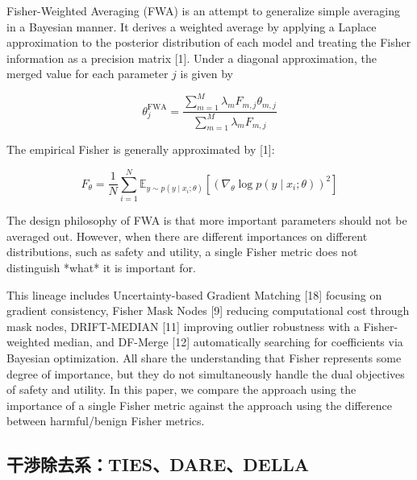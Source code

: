 \documentclass{article}
\begin{document}
Fisher-Weighted Averaging (FWA) is an attempt to generalize simple averaging in a Bayesian manner. It derives a weighted average by applying a Laplace approximation to the posterior distribution of each model and treating the Fisher information as a precision matrix [1]. Under a diagonal approximation, the merged value for each parameter $j$ is given by

\[
\theta_j^{\mathrm{FWA}}=\frac{\sum_{m=1}^{M}\lambda_m F_{m,j}\theta_{m,j}}{\sum_{m=1}^{M}\lambda_m F_{m,j}}
\tag{4}
\]

The empirical Fisher is generally approximated by [1]:

\[
\hat F_{\theta}=\frac{1}{N}\sum_{i=1}^{N}\mathbb{E}_{y\sim p(y\mid x_i;\theta)}\left[(\nabla_{\theta}\log p(y\mid x_i;\theta))^2\right]
\tag{5}
\]

The design philosophy of FWA is that more important parameters should not be averaged out. However, when there are different importances on different distributions, such as safety and utility, a single Fisher metric does not distinguish *what* it is important for.

This lineage includes Uncertainty-based Gradient Matching [18] focusing on gradient consistency, Fisher Mask Nodes [9] reducing computational cost through mask nodes, DRIFT-MEDIAN [11] improving outlier robustness with a Fisher-weighted median, and DF-Merge [12] automatically searching for coefficients via Bayesian optimization. All share the understanding that Fisher represents some degree of importance, but they do not simultaneously handle the dual objectives of safety and utility. In this paper, we compare the approach using the importance of a single Fisher metric against the approach using the difference between harmful/benign Fisher metrics.

\subsection{干渉除去系：TIES、DARE、DELLA}




\end{document}
